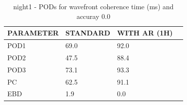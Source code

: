 \begin{table}[p!]
\begin{center}
\begin{tabular}{|l|l|l|l|}
\hline
\multicolumn{1}{|c|}{\cellcolor[HTML]{C0C0C0}\textbf{PARAMETER}} & \multicolumn{1}{c|}{\cellcolor[HTML]{C0C0C0}\textbf{STANDARD}} & \multicolumn{1}{c|}{\cellcolor[HTML]{C0C0C0}\textbf{WITH AR (1H)}} \\
\hline
\cellcolor[HTML]{C0C0C0}POD1  & 69.0                                & 92.0         \\
\cellcolor[HTML]{C0C0C0}POD2  & 47.5                                & 88.4         \\
\cellcolor[HTML]{C0C0C0}POD3  & 73.1                                & 93.3         \\
\cellcolor[HTML]{C0C0C0}PC    & 62.5                                  & 91.1           \\
\cellcolor[HTML]{C0C0C0}EBD   & 1.9                                 & 0.0          \\
\hline
\end{tabular}
\caption{night1 - PODs for wavefront coherence time (ms) and accuray 0.0}
\label{tab:podtau0.0:night1}
\end{center}
\end{table}
